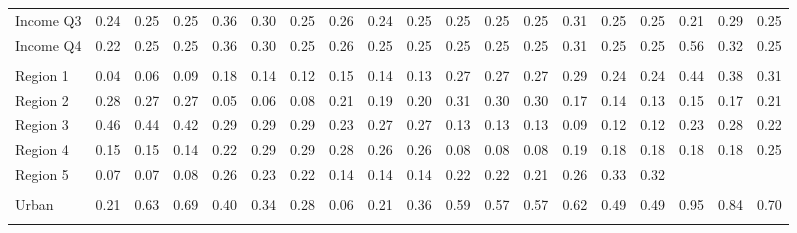 \begin{tabular}{l*{18}{c}}
Income Q3 & 0.24 & 0.25 & 0.25 & 0.36 & 0.30 & 0.25 & 0.26 & 0.24 & 0.25 & 0.25 & 0.25 & 0.25 & 0.31 & 0.25 & 0.25 & 0.21 & 0.29 & 0.25 \\
Income Q4 & 0.22 & 0.25 & 0.25 & 0.36 & 0.30 & 0.25 & 0.26 & 0.25 & 0.25 & 0.25 & 0.25 & 0.25 & 0.31 & 0.25 & 0.25 & 0.56 & 0.32 & 0.25 \\
\\
Region 1 & 0.04 & 0.06 & 0.09 & 0.18 & 0.14 & 0.12 & 0.15 & 0.14 & 0.13 & 0.27 & 0.27 & 0.27 & 0.29 & 0.24 & 0.24 & 0.44 & 0.38 & 0.31 \\
Region 2 & 0.28 & 0.27 & 0.27 & 0.05 & 0.06 & 0.08 & 0.21 & 0.19 & 0.20 & 0.31 & 0.30 & 0.30 & 0.17 & 0.14 & 0.13 & 0.15 & 0.17 & 0.21 \\
Region 3 & 0.46 & 0.44 & 0.42 & 0.29 & 0.29 & 0.29 & 0.23 & 0.27 & 0.27 & 0.13 & 0.13 & 0.13 & 0.09 & 0.12 & 0.12 & 0.23 & 0.28 & 0.22 \\
Region 4 & 0.15 & 0.15 & 0.14 & 0.22 & 0.29 & 0.29 & 0.28 & 0.26 & 0.26 & 0.08 & 0.08 & 0.08 & 0.19 & 0.18 & 0.18 & 0.18 & 0.18 & 0.25 \\
Region 5 & 0.07 & 0.07 & 0.08 & 0.26 & 0.23 & 0.22 & 0.14 & 0.14 & 0.14 & 0.22 & 0.22 & 0.21 & 0.26 & 0.33 & 0.32 & & & \\
\\
Urban & 0.21 & 0.63 & 0.69 & 0.40 & 0.34 & 0.28 & 0.06 & 0.21 & 0.36 & 0.59 & 0.57 & 0.57 & 0.62 & 0.49 & 0.49 & 0.95 & 0.84 & 0.70 \\
\\
\bottomrule
\end{tabular}